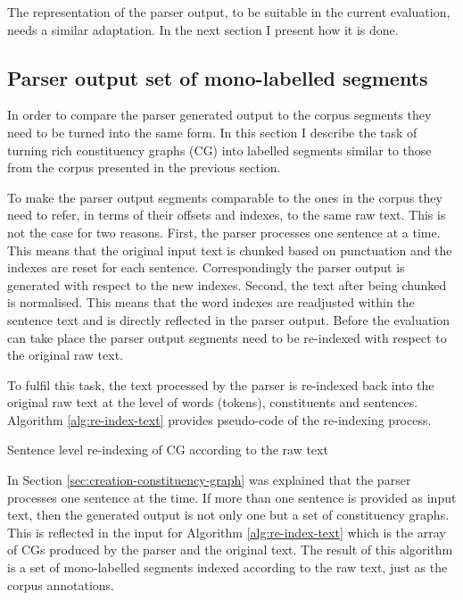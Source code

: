     The representation of the parser output, to be suitable in the current evaluation, needs a similar adaptation. In the next section I present how it is done. 

\subsection{Parser output set of mono-labelled segments}
    
    In order to compare the parser generated output to the corpus segments they need to be turned into the same form. In this section I describe the task of turning rich constituency graphs (CG) into labelled segments similar to those from the corpus presented in the previous section. 
    
    To make the parser output segments comparable to the ones in the corpus they need to refer, in terms of their offsets and indexes, to the same raw text. This is not the case for two reasons. First, the parser processes one sentence at a time. This means that the original input text is chunked based on punctuation and the indexes are reset for each sentence. Correspondingly the parser output is generated with respect to the new indexes. Second, the text after being chunked is normalised. This means that the word indexes are readjusted within the sentence text and is directly reflected in the parser output. Before the evaluation can take place the parser output segments need to be re-indexed with respect to the original raw text. 
    
    To fulfil this task, the text processed by the parser is re-indexed back into the original raw text at the level of words (tokens), constituents and sentences. Algorithm \ref{alg:re-index-text} provides pseudo-code of the re-indexing process.
     
    \begin{algorithm}[!ht]
        \caption{Sentence level re-indexing of CG according to the raw text}
        \label{alg:re-index-text}
    \end{algorithm}

    In Section \ref{sec:creation-constituency-graph} was explained that the parser processes one sentence at the time. If more than one sentence is provided as input text, then the generated output is not only one but a set of constituency graphs. This is reflected in the input for Algorithm \ref{alg:re-index-text} which is the array of CGs produced by the parser and the original text. The result of this algorithm is a set of mono-labelled segments indexed according to the raw text, just as the corpus annotations. 
    
